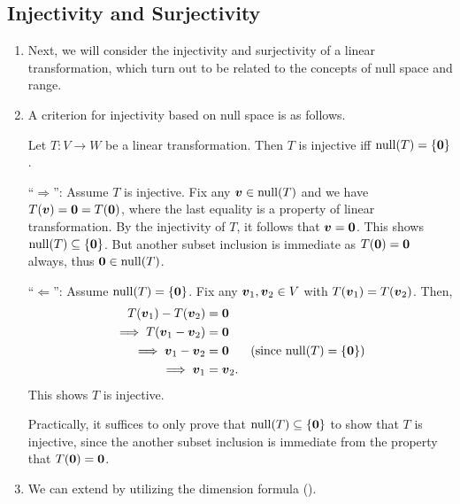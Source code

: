 \subsection{Injectivity and Surjectivity}
\begin{enumerate}
\item Next, we will consider the injectivity and surjectivity of a linear
transformation, which turn out to be related to the concepts of null space and
range.

\item A criterion for injectivity based on null space is as follows.

\begin{proposition}
\label{prp:inj-iff-null-sp-only-zero}
Let \(T:V\to W\) be a linear transformation. Then \(T\) is injective iff
\(\operatorname{null}(T)=\{\vb*{0}\}\).
\end{proposition}
\begin{pf}
``\(\Rightarrow\)'': Assume \(T\) is injective. Fix any \(\vb*{v}\in\operatorname{null}(T)\)
and we have \(T(\vb*{v})=\vb*{0}=T(\vb*{0})\), where the last equality is a
property of linear transformation. By the injectivity of \(T\), it follows that
\(\vb*{v}=\vb*{0}\). This shows \(\operatorname{null}(T)\subseteq \{\vb*{0}\}\). But
another subset inclusion is immediate as \(T(\vb*{0})=\vb*{0}\) always, thus
\(\vb*{0}\in\operatorname{null}(T)\).

``\(\Leftarrow\)'': Assume \(\operatorname{null}(T)=\{\vb*{0}\}\). Fix any
\(\vb*{v}_1,\vb*{v}_2\in V\) with \(T(\vb*{v}_1)=T(\vb*{v}_2)\). Then,
\begin{align*}
T(\vb*{v}_1)-T(\vb*{v}_2)&=\vb*{0} \\
\implies T(\vb*{v}_1-\vb*{v}_2)&=\vb*{0} \\
\implies \vb*{v}_1-\vb*{v}_2&=\vb*{0} &\text{(since \(\operatorname{null}(T)=\{\vb*{0}\}\))}\\
\implies \vb*{v}_1&=\vb*{v}_2.
\end{align*}
This shows \(T\) is injective.
\end{pf}

\begin{note}
Practically, it suffices to only prove that \(\operatorname{null}(T)\subseteq \{\vb*{0}\}\)
to show that \(T\) is injective, since the another subset inclusion is
immediate from the property that \(T(\vb*{0})=\vb*{0}\).
\end{note}

\item We can extend  by utilizing the
dimension formula ().


\end{enumerate}
